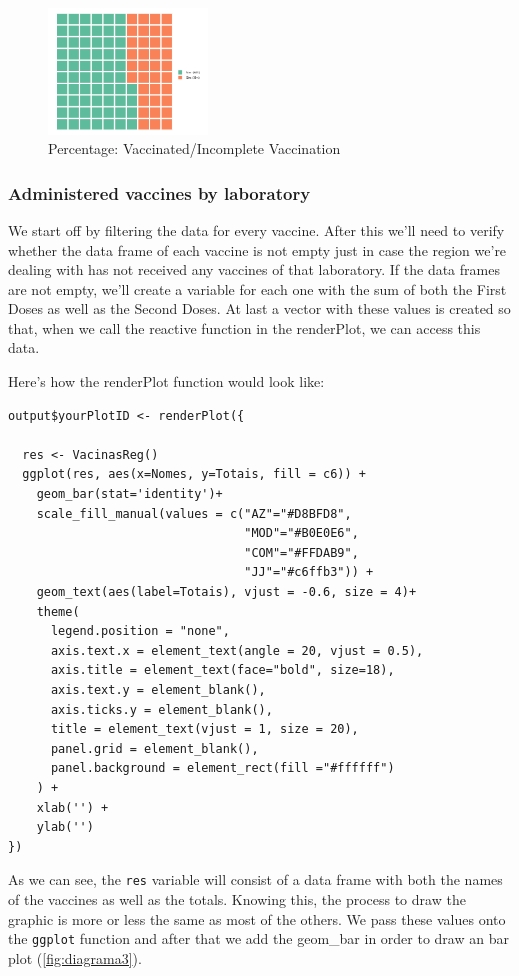 \begin{figure}[H]
\centering
\includegraphics[width=160px,trim=10 0 0 -10mm]{images/graficomapa2.png}
\caption{Percentage: Vaccinated/Incomplete Vaccination}
\label{fig:diagrama2}
\end{figure}

\subsubsection{Administered vaccines by laboratory}

We start off by filtering the data for every vaccine. After this we'll need to verify whether the data frame of each vaccine is not empty just in case the region we're dealing with has not received any vaccines of that laboratory. If the data frames are not empty, we'll create a variable for each one with the sum of both the First Doses as well as the Second Doses. At last a vector with these values is created so that, when we call the reactive function in the renderPlot, we can access this data.

Here's how the renderPlot function would look like:

\begin{verbatim}
output$yourPlotID <- renderPlot({
  
  res <- VacinasReg()
  ggplot(res, aes(x=Nomes, y=Totais, fill = c6)) + 
    geom_bar(stat='identity')+ 
    scale_fill_manual(values = c("AZ"="#D8BFD8",
                                 "MOD"="#B0E0E6",
                                 "COM"="#FFDAB9",
                                 "JJ"="#c6ffb3")) +
    geom_text(aes(label=Totais), vjust = -0.6, size = 4)+
    theme(
      legend.position = "none",
      axis.text.x = element_text(angle = 20, vjust = 0.5),
      axis.title = element_text(face="bold", size=18),
      axis.text.y = element_blank(),
      axis.ticks.y = element_blank(),
      title = element_text(vjust = 1, size = 20),
      panel.grid = element_blank(),
      panel.background = element_rect(fill ="#ffffff")
    ) + 
    xlab('') +
    ylab('') 
})
\end{verbatim}

As we can see, the \verb!res! variable will consist of a data frame with both the names of the vaccines as well as the totals. Knowing this, the process to draw the graphic is more or less the same as most of the others. We pass these values onto the \verb!ggplot! function and after that we add the geom\_bar in order to draw an bar plot (\ref{fig:diagrama3}). 


